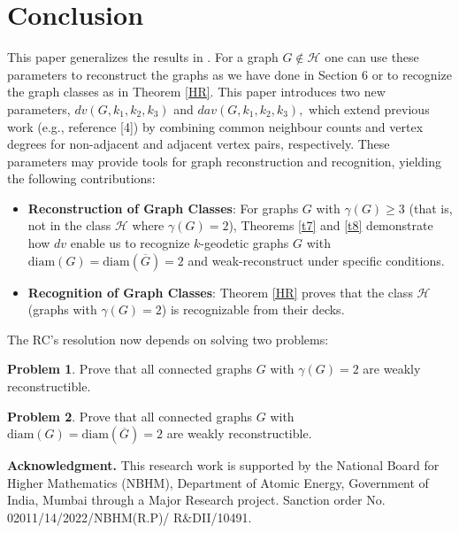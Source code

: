 \documentclass[11pt,oneside]{article}
\theoremstyle{definition}
\newtheorem{pbm}{Problem}
\begin{document}
\section{Conclusion}
\indent \indent This paper generalizes the results in \cite{g}. For a graph $G \notin \mathscr{H}$ one can use these parameters to reconstruct the graphs as we have done in Section 6 or to recognize the graph classes as in Theorem \ref{HR}. 
This paper introduces two new parameters, $dv(G,k_1,k_2,k_3)$ and $dav(G,k_1,k_2,k_3),$ which extend previous work (e.g., reference [4]) by combining common neighbour counts and vertex degrees for non-adjacent and adjacent vertex pairs, respectively. These parameters may provide tools for graph reconstruction and recognition, yielding the following contributions:
\begin{itemize}
        \item {\bf Reconstruction of Graph Classes}: { For graphs $G$ with $\gamma(G) \geq 3$ (that is, not in the class $\mathscr{H}$ where $\gamma(G)=2$), Theorems \ref{t7} and \ref{t8} demonstrate how $dv$ enable us to recognize $k$-geodetic graphs $G$ with $\mathrm{diam}(G)=\mathrm{diam}(\overline{G})=2$ and weak-reconstruct under specific conditions.} 

 \item {\bf Recognition of Graph Classes}: Theorem \ref{HR}  proves that the class $\mathscr{H}$ (graphs with $\gamma(G)=2$) is recognizable from their decks.
\end{itemize}

The RC's resolution now depends on solving two problems:
\begin{pbm}\label{p1}
Prove that all connected graphs $G$ with $\gamma(G)=2$ are weakly reconstructible.
\end{pbm}  
\begin{pbm}\label{p2}
Prove that all connected graphs $G$ with $\text{diam}(G)=\text{diam}(\overline{G})=2$ are weakly reconstructible.
\end{pbm}


\noindent\textbf{Acknowledgment.} This research work is supported by the National Board for Higher Mathematics (NBHM), Department of Atomic Energy, Government of India, Mumbai through a Major Research project. Sanction order No. 02011/14/2022/NBHM(R.P)/ $\text{R\&D}$II/10491.\\
\end{document}
